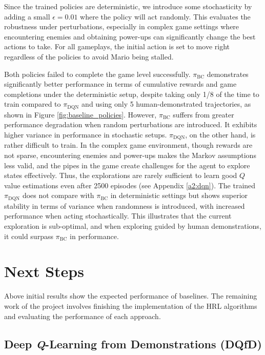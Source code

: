 \documentclass{article}
\begin{document}
Since the trained policies are deterministic, we introduce some stochasticity 
by adding a small $\epsilon=0.01$ where the policy will act randomly. This evaluates 
the robustness under perturbations, especially in complex game settings where 
encountering enemies and obtaining power-ups can significantly change the best 
actions to take. For all gameplays, the initial action is set to move right 
regardless of the policies to avoid Mario being stalled.

Both policies failed to complete the game level successfully.
$\pi_{\text{BC}}$ demonstrates significantly better performance in terms of 
cumulative rewards and game completions under the deterministic setup, despite 
taking only 1/8 of the time to train compared to $\pi_{\text{DQN}}$ and using 
only 5 human-demonstrated trajectories, as shown in Figure 
\ref{fig:baseline_policies}. However, $\pi_{\text{BC}}$ suffers from greater 
performance degradation when random perturbations are introduced. It exhibits 
higher variance in performance in stochastic setups.
$\pi_{\text{DQN}}$, on the other hand, is rather difficult to train. In the 
complex game environment, though rewards are not sparse, encountering enemies 
and power-ups makes the Markov assumptions less valid, and the pipes in the 
game create challenges for the agent to explore states effectively. Thus, the 
explorations are rarely sufficient to learn good $Q$ value estimations even 
after 2500 episodes (see Appendix \ref{a2:dqn}). The trained $\pi_{\text{DQN}}$ 
does not compare with $\pi_{\text{BC}}$ in deterministic settings but shows 
superior stability in terms of variance when randomness is introduced, with 
increased performance when acting stochastically. This illustrates that the 
current exploration is sub-optimal, and when exploring guided by human 
demonstrations, it could surpass $\pi_{\text{BC}}$ in performance.

\section{Next Steps}
Above initial results show the expected performance of baselines. The remaining 
work of the project involves finishing the implementation of the HRL algorithms 
and evaluating the performance of each approach.

\subsection{Deep \textit{Q}-Learning from Demonstrations (DQfD)}
\end{document}
